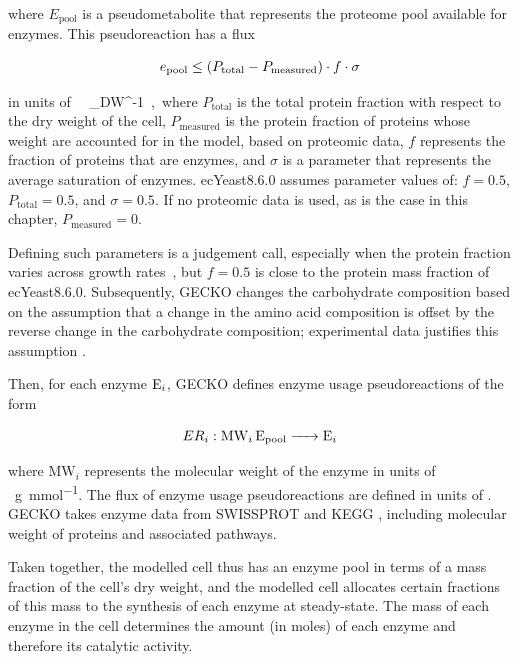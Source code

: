 where $E_{\mathrm{pool}}$ is a pseudometabolite that represents the proteome pool available for enzymes.
This pseudoreaction has a flux

\begin{equation}
  e_{\mathrm{pool}} \leq (P_{\mathrm{total}} - P_{\mathrm{measured}}) \cdot f \cdot \sigma
  \label{eq:model-gecko-enzyme-pool-flux}
\end{equation}

in units of \SI{}{\gram~\gram_{DW}^{-1}}, where
$P_{\mathrm{total}}$ is the total protein fraction with respect to the dry weight of the cell,
$P_{\mathrm{measured}}$ is the protein fraction of proteins whose weight are accounted for in the model, based on proteomic data,
$f$ represents the fraction of proteins that are enzymes, and
$\sigma$ is a parameter that represents the average saturation of enzymes.
ecYeast8.6.0 assumes parameter values of: $f = 0.5$, $P_{\mathrm{total}} = 0.5$, and $\sigma = 0.5$.
If no proteomic data is used, as is the case in this chapter, $P_{\mathrm{measured}} = 0$.

Defining such parameters is a judgement call, especially when the protein fraction varies across growth rates~\parencite{elsemmanWholecellModelingYeast2022}, but $f = 0.5$ is close to the protein mass fraction of ecYeast8.6.0.
Subsequently, GECKO changes the carbohydrate composition based on the assumption that a change in the amino acid composition is offset by the reverse change in the carbohydrate composition;
experimental data justifies this assumption \parencite{nissenFluxDistributionsAnaerobic1997}.

Then, for each enzyme $\ce{E_{i}}$, GECKO defines enzyme usage pseudoreactions of the form

\begin{equation}
  ER_{i}: \ce{ MW_{i} E_{\mathrm{pool}} -> E_{i} }
  \label{eq:model-gecko-enzyme-usage}
\end{equation}

where $\mathrm{MW}_{i}$ represents the molecular weight of the enzyme in units of \SI{}{\gram~\milli\mole^{-1}}.
The flux of enzyme usage pseudoreactions are defined in units of \SI{}{\mmolgdw}.
GECKO takes enzyme data from SWISSPROT \parencite{theuniprotconsortiumUniProtUniversalProtein2023} and KEGG \parencite{kanehisaKEGGTaxonomybasedAnalysis2023}, including molecular weight of proteins and associated pathways.

Taken together, the modelled cell thus has an enzyme pool in terms of a mass fraction of the cell's dry weight, and the modelled cell allocates certain fractions of this mass to the synthesis of each enzyme at steady-state.
The mass of each enzyme in the cell determines the amount (in moles) of each enzyme and therefore its catalytic activity.


